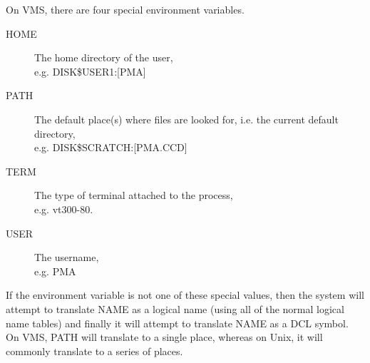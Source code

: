 \begin{small}
{{{         \sstitem
         On VMS, there are four special environment variables.
\begin{description}
\item[HOME] The home directory of the user,\\e.g. DISK\$USER1:[PMA]
\item[PATH] The default place(s) where files are looked for, i.e. the current
default directory,\\
            e.g. DISK\$SCRATCH:[PMA.CCD]
\item[TERM] The type of terminal attached to the process,\\
            e.g. vt300-80.
\item[USER] The username,\\
             e.g. PMA
\end{description}
            If the environment variable is not one of these special values,
            then the system will attempt to translate NAME as a logical
            name (using all of the normal logical name tables) and finally
            it will attempt to translate NAME as a DCL symbol.
         \sstitem
         On VMS, PATH will translate to a single place, whereas on Unix,
         it will commonly translate to a series of places.
      }
   }
}
\end{small}
